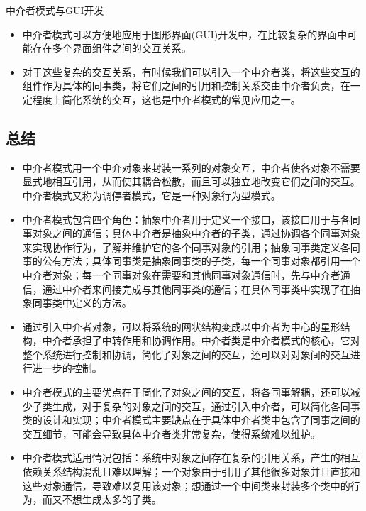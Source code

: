 \documentclass[letterpaper,10pt,english]{sphinxmanual}
\begin{document}
\sphinxAtStartPar
中介者模式与GUI开发
\begin{itemize}
\item {} 
\sphinxAtStartPar
中介者模式可以方便地应用于图形界面(GUI)开发中，在比较复杂的界面中可能存在多个界面组件之间的交互关系。

\item {} 
\sphinxAtStartPar
对于这些复杂的交互关系，有时候我们可以引入一个中介者类，将这些交互的组件作为具体的同事类，将它们之间的引用和控制关系交由中介者负责，在一定程度上简化系统的交互，这也是中介者模式的常见应用之一。

\end{itemize}


\subsection{总结}
\label{\detokenize{behavioral_patterns/mediator:id15}}\begin{itemize}
\item {} 
\sphinxAtStartPar
中介者模式用一个中介对象来封装一系列的对象交互，中介者使各对象不需要显式地相互引用，从而使其耦合松散，而且可以独立地改变它们之间的交互。中介者模式又称为调停者模式，它是一种对象行为型模式。

\item {} 
\sphinxAtStartPar
中介者模式包含四个角色：抽象中介者用于定义一个接口，该接口用于与各同事对象之间的通信；具体中介者是抽象中介者的子类，通过协调各个同事对象来实现协作行为，了解并维护它的各个同事对象的引用；抽象同事类定义各同事的公有方法；具体同事类是抽象同事类的子类，每一个同事对象都引用一个中介者对象；每一个同事对象在需要和其他同事对象通信时，先与中介者通信，通过中介者来间接完成与其他同事类的通信；在具体同事类中实现了在抽象同事类中定义的方法。

\item {} 
\sphinxAtStartPar
通过引入中介者对象，可以将系统的网状结构变成以中介者为中心的星形结构，中介者承担了中转作用和协调作用。中介者类是中介者模式的核心，它对整个系统进行控制和协调，简化了对象之间的交互，还可以对对象间的交互进行进一步的控制。

\item {} 
\sphinxAtStartPar
中介者模式的主要优点在于简化了对象之间的交互，将各同事解耦，还可以减少子类生成，对于复杂的对象之间的交互，通过引入中介者，可以简化各同事类的设计和实现；中介者模式主要缺点在于具体中介者类中包含了同事之间的交互细节，可能会导致具体中介者类非常复杂，使得系统难以维护。

\item {} 
\sphinxAtStartPar
中介者模式适用情况包括：系统中对象之间存在复杂的引用关系，产生的相互依赖关系结构混乱且难以理解；一个对象由于引用了其他很多对象并且直接和这些对象通信，导致难以复用该对象；想通过一个中间类来封装多个类中的行为，而又不想生成太多的子类。

\end{itemize}
\end{document}
